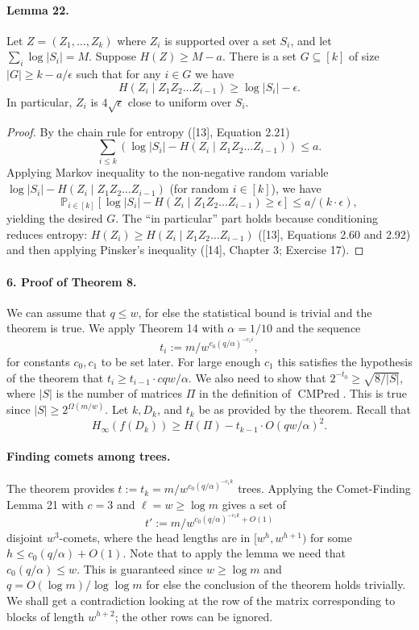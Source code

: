 \documentclass[10pt,a4paper]{article}
\begin{document}
\paragraph{Lemma 22.}
Let $Z=(Z_1,\ldots,Z_k)$ where $Z_i$ is supported over a set $S_i$, and let $\sum_i\log|S_i|=M$. Suppose $H(Z)\geq M-a$. There is a set $G\subseteq[k]$ of size $|G|\geq k-a/\epsilon$ such that for any $i\in G$ we have
\[H(Z_i\mid Z_1Z_2\ldots Z_{i-1})\geq\log|S_i|-\epsilon.\]
In particular, $Z_i$ is $4\sqrt\epsilon$ close to uniform over $S_i$.
\begin{proof}
By the chain rule for entropy ([13], Equation 2.21)
\[\sum_{i\leq k}(\log|S_i|-H(Z_i\mid Z_1Z_2\ldots Z_{i-1}))\leq a.\]
Applying Markov inequality to the non-negative random variable $\log|S_i|-H(Z_i\mid Z_1Z_2\ldots Z_{i-1})$ (for random $i\in[k]$), we have
\[\mathbb P_{i\in[k]}[\log|S_i|-H(Z_i\mid Z_1Z_2\ldots Z_{i-1})\geq\epsilon]\leq a/(k\cdot\epsilon),\]
yielding the desired $G$.
The ``in particular'' part holds because conditioning reduces entropy: $H(Z_i)\geq H(Z_i\mid Z_1Z_2\ldots Z_{i-1})$ ([13], Equations 2.60 and 2.92) and then applying Pinsker's inequality ([14], Chapter 3; Exercise 17).
\end{proof}

\paragraph{6. Proof of Theorem 8.}
We can assume that $q\leq w$, for else the statistical bound is trivial and the theorem is true. We apply Theorem 14 with $\alpha=1/10$ and the sequence
\[t_i:=m/w^{c_0(q/\alpha)^{-c_1i}},\]
for constants $c_0,c_1$ to be set later. For large enough $c_1$ this satisfies the hypothesis of the theorem that $t_i\geq t_{i-1}\cdot cqw/\alpha$. We also need to show that $2^{-t_0}\geq\sqrt{8/|S|}$, where $|S|$ is the number of matrices $\Pi$ in the definition of $\operatorname{CMPred}$. This is true since $|S|\geq2^{\Omega(m/w)}$.
Let $k,D_k$, and $t_k$ be as provided by the theorem. Recall that
\[H_\infty(f(D_k))\geq H(\Pi)-t_{k-1}\cdot O(qw/\alpha)^2.\]
\paragraph{Finding comets among trees.}
The theorem provides $t:=t_k=m/w^{c_0(q/\alpha)^{-c_1k}}$ trees. Applying the Comet-Finding Lemma 21 with $c=3$ and $\ell=w\geq\log m$ gives a set of
\[t':=m/w^{c_0(q/\alpha)^{-c_1k}+O(1)}\]
disjoint $w^3$-comets, where the head lengths are in $[w^h,w^{h+1})$ for some $h\leq c_0(q/\alpha)+O(1)$. Note that to apply the lemma we need that $c_0(q/\alpha)\leq w$. This is guaranteed since $w\geq\log m$ and $q=O(\log m)/\log\log m$ for else the conclusion of the theorem holds trivially.
We shall get a contradiction looking at the row of the matrix corresponding to blocks of length $w^{h+2}$; the other rows can be ignored.
\end{document}
